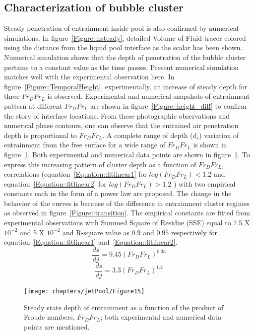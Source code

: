\subsection{Characterization of bubble cluster}
Steady penetration of entrainment inside pool is also confirmed by numerical simulations. In figure~\ref{Figure::hsteady}, detailed Volume of Fluid tracer colored using the distance from the liquid pool interface as the scalar has been shown. Numerical simulation shows that the depth of penetration of the bubble cluster pertains to a constant value as the time passes. Present numerical simulation matches well with the experimental observation here. In figure~\ref{Figure::TemporalHeight}, experimentally, an increase of steady depth for three $Fr_DFr_L$ is observed. Experimental and numerical snapshots of entrainment pattern at different $Fr_DFr_L$ are shown in figure~\ref{Figure::height_diff} to confirm the story of interface locations. From these photographic observations and numerical phase contours, one can observe that the entrained air penetration depth is proportional to $Fr_DFr_L$. A complete range of depth ($d_s$) variation of entrainment from the free surface for a wide range of $Fr_DFr_L$ is shown in  figure~\ref{Figure::hFr}. Both experimental and numerical data points are shown in figure~\ref{Figure::hFr}. To express this increasing pattern of cluster depth as a function of $Fr_DFr_L$, correlations (equation~\ref{Equation::fitlinear1} for $log(Fr_DFr_L) < 1.2$ and equation~\ref{Equation::fitlinear2} for $log(Fr_DFr_L) > 1.2$ ) with two empirical constants each in the form of a power law are proposed. The change in the behavior of the curves is because of the difference in entrainment cluster regimes as observed in figure~\ref{Figure::transition}. The empirical constants are fitted from experimental observations with Summed Square of Residue (SSE) equal to 7.5 X $10^{-2}$ and 5 X $10^{-2}$ and R-square value as $0.9$ and $0.95$ respectively for equation~\ref{Equation::fitlinear1} and~\ref{Equation::fitlinear2}. 
\begin{equation}
\frac{ds}{dj} = 9.45(Fr_DFr_L)^{0.33}
\label{Equation::fitlinear1}
\end{equation}%
\begin{equation}
\frac{ds}{dj} = 3.3(Fr_DFr_L)^{1.2}
\label{Equation::fitlinear2}
\end{equation}%
\begin{figure}
	\centering
	\texttt{[image: chapters/jetPool/Figure15]}
	\caption{Steady state depth of entrainment as a function of the product of Froude numbers, $Fr_DFr_L$; both experimental and numerical data points are mentioned.}
	\label{Figure::hFr}
\end{figure}
